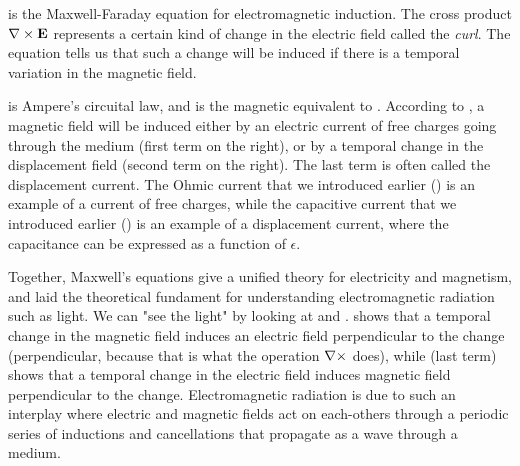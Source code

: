  is the Maxwell-Faraday equation for electromagnetic induction. The cross product ${\bf \nabla} \times {\bf E}$ represents a certain kind of change in the electric field called the \textit{curl}. The equation tells us that such a change will be induced if there is a temporal variation in the magnetic field. 

 is Ampere's circuital law, and is the magnetic equivalent to . According to , a magnetic field will be induced either by an electric current of free charges going through the medium (first term on the right), or by a temporal change in the displacement field (second term on the right). The last term is often called the displacement current. The Ohmic current that we introduced earlier () is an example of a current of free charges, while the capacitive current that we introduced earlier () is an example of a displacement current, where the capacitance can be expressed as a function of $\epsilon$. 

Together, Maxwell's equations give a unified theory for electricity and magnetism, and laid the theoretical fundament for understanding electromagnetic radiation such as light. We can "see the light" by looking at  and .  shows that a temporal change in the magnetic field induces an electric field perpendicular to the change (perpendicular, because that is what the operation ${\bf \nabla} \times$ does), while  (last term) shows that a temporal change in the electric field induces magnetic field perpendicular to the change. Electromagnetic radiation is due to such an interplay where electric and magnetic fields act on each-others  through a periodic series of inductions and cancellations that propagate as a wave through a medium. 

